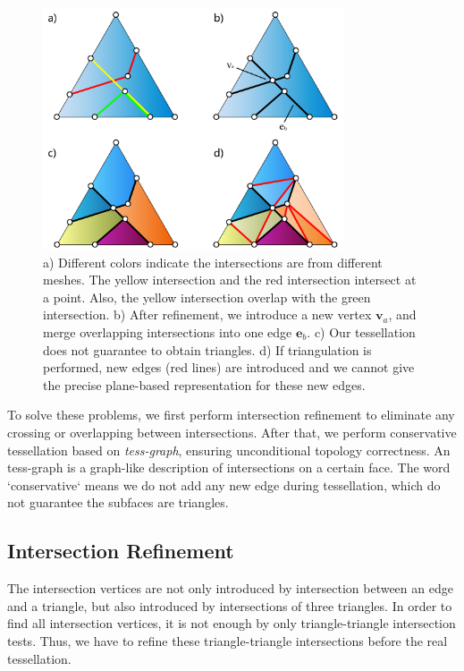 \documentclass[10pt,journal,compsoc]{IEEEtran}
\begin{document}
\begin{figure}[t]
\centering
\includegraphics[width=3.5in]{boolean-04}
\caption{a) Different colors indicate the intersections are from different meshes. The yellow intersection and the red intersection intersect at a point. Also, the yellow intersection overlap with the green intersection. b) After refinement, we introduce a new vertex $\bm{v}_a$, and merge overlapping intersections into one edge $\bm{e}_b$. c) Our tessellation does not guarantee to obtain triangles. d) If triangulation is performed, new edges (red lines) are introduced and we cannot give the precise plane-based representation for these new edges.}
\label{fig:iisect}
\end{figure}

To solve these problems, we first perform intersection refinement to eliminate any crossing or overlapping between intersections. After that, we perform conservative tessellation based on \emph{tess-graph}, ensuring unconditional topology correctness. An tess-graph is a graph-like description of intersections on a certain face. The word `conservative` means we do not add any new edge during tessellation, which do not guarantee the subfaces are triangles.

\subsection{Intersection Refinement}

\label{sec:refine}
The intersection vertices are not only introduced by intersection between an edge and a triangle, but also introduced by intersections of three triangles. In order to find all intersection vertices, it is not enough by only triangle-triangle intersection tests. Thus, we have to refine these triangle-triangle intersections before the real tessellation.
\end{document}
